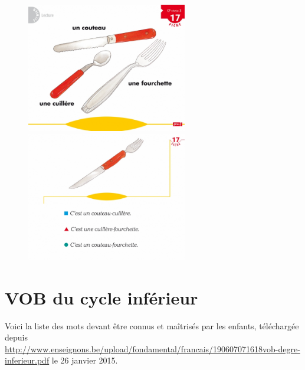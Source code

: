\begin{center}
\begin{figure}[h]
\begin{minipage}[c]{.46\linewidth}
   \end{minipage}
\end{figure}
\vline
\vline
\begin{figure}[h]
   \begin{minipage}[c]{.46\linewidth}
      \includegraphics[width=7cm]{img/CP_niv3_f17recto.jpg}
   \end{minipage}  
   \begin{minipage}[c]{.46\linewidth}
      \includegraphics[width=7cm]{img/CP_niv3_f17verso.jpg}
   \end{minipage}
\end{figure}
\end{center}

\newpage
\section{VOB du cycle inférieur \label{listeVob}}
Voici la liste des mots devant être connus et maîtrisés par les enfants, téléchargée depuis \url{http://www.enseignons.be/upload/fondamental/francais/190607071618vob-degre-inferieur.pdf} le 26 janvier 2015.


